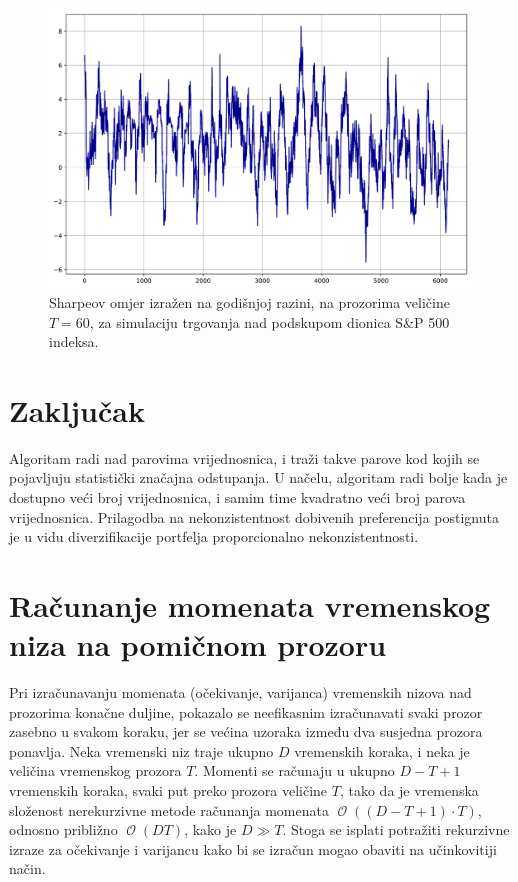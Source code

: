 \documentclass[lmodern, utf8, diplomski, numeric]{fer}
\newcommand{\bigO}[1]{\operatorname{\mathcal{O}}\q(#1\w)}
\newcommand{\q}{\left}
\newcommand{\w}{\right}
\begin{document}
  \begin{figure}[p]
    \centering
    \includegraphics[width=\linewidth]{graphics/sharpe1.pdf}
    \caption{Sharpeov omjer izražen na godišnjoj razini, na prozorima veličine $T = 60$, za simulaciju trgovanja nad podskupom dionica S\&P 500 indeksa.}
    \label{fig:sharpe3}
  \end{figure}
  
  
  \pagebreak
  

  \chapter{Zaključak}
  Algoritam radi nad parovima vrijednosnica, i traži takve parove kod kojih se pojavljuju statistički značajna odstupanja.
  U načelu, algoritam radi bolje kada je dostupno veći broj vrijednosnica, i samim time kvadratno veći broj parova vrijednosnica.
  Prilagodba na nekonzistentnost dobivenih preferencija postignuta je u vidu diverzifikacije portfelja proporcionalno nekonzistentnosti.
  
  
  

  \appendix
  \chapter{Računanje momenata vremenskog niza na pomičnom prozoru}
  \label{appendix}
  Pri izračunavanju momenata (očekivanje, varijanca) vremenskih nizova nad prozorima konačne duljine, pokazalo se neefikasnim izračunavati svaki prozor zasebno u svakom koraku, jer se većina uzoraka između dva susjedna prozora ponavlja.
  Neka vremenski niz traje ukupno $D$ vremenskih koraka, i neka je veličina vremenskog prozora $T$.
  Momenti se računaju u ukupno $D - T + 1$ vremenskih koraka, svaki put preko prozora veličine $T$, tako da je vremenska složenost nerekurzivne metode računanja momenata $\bigO{\q(D - T + 1\w)\cdot T}$, odnosno približno $\bigO{DT}$, kako je $D \gg T$.
  Stoga se isplati potražiti rekurzivne izraze za očekivanje i varijancu kako bi se izračun mogao obaviti na učinkovitiji način.
  
\end{document}
